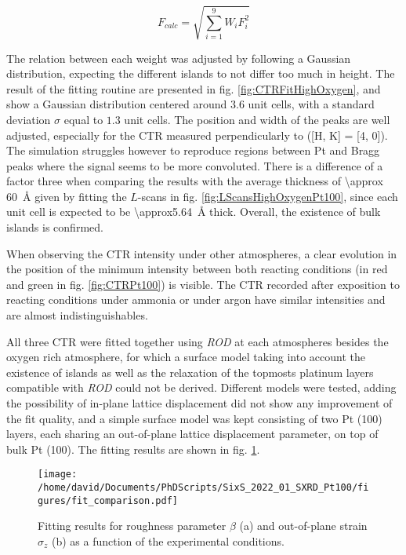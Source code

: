 \begin{equation}
    F_{calc} = \sqrt{\sum_{i=1}^{9} W_i F_i^2}
    \label{eq:Fcalc}
\end{equation}

The relation between each weight was adjusted by following a Gaussian distribution, expecting the different islands to not differ too much in height.
The result of the fitting routine are presented in fig. \ref{fig:CTRFitHighOxygen}, and show a Gaussian distribution centered around $3.6$ unit cells, with a standard deviation $\sigma$ equal to $1.3$ unit cells.
The position and width of the  peaks are well adjusted, especially for the CTR measured perpendicularly to ([H, K] = [4, 0]).
The simulation struggles however to reproduce regions between Pt and  Bragg peaks where the signal seems to be more convoluted.
There is a difference of a factor three when comparing the results with the average thickness of \qty{\approx 60}{\angstrom} given by fitting the $L$-scans in fig. \ref{fig:LScansHighOxygenPt100}, since each unit cell is expected to be \qty{\approx5.64}{\angstrom} thick.
Overall, the existence of bulk  islands is confirmed.

When observing the CTR intensity under other atmospheres, a clear evolution in the position of the minimum intensity between both reacting conditions (in red and green in fig. \ref{fig:CTRPt100}) is visible.
The CTR recorded after exposition to reacting conditions under ammonia or under argon have similar intensities and are almost indistinguishables.

All three CTR were fitted together using \textit{ROD} at each atmospheres besides the oxygen rich atmosphere, for which a surface model taking into account the existence of  islands as well as the relaxation of the topmosts platinum layers compatible with \textit{ROD} could not be derived.
Different models were tested, adding the possibility of in-plane lattice displacement did not show any improvement of the fit quality, and a simple surface model was kept consisting of two Pt (100) layers, each sharing an out-of-plane lattice displacement parameter, on top of bulk Pt (100).
The fitting results are shown in fig. \ref{fig:CTRFit100}.

\begin{figure}[!htb]
    \centering
    \texttt{[image: /home/david/Documents/PhDScripts/SixS\_2022\_01\_SXRD\_Pt100/figures/fit\_comparison.pdf]}
    \caption{
        Fitting results for roughness parameter $\beta$ (a) and out-of-plane strain $\sigma_z$ (b) as a function of the experimental conditions.
    }
    \label{fig:CTRFit100}
\end{figure}

